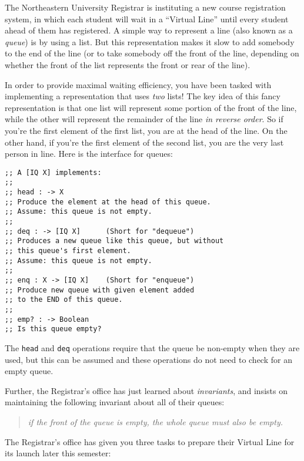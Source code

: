 \documentclass[12pt]{article}                   %
\def\pts#1{\marginpar{\footnotesize \raggedright  \fbox{#1 {\sc Points}}}}
\newcommand\code[1]{\texttt{#1}}
\begin{document}
\begin{problem} \pts{21}

The Northeastern University Registrar is instituting a new course
registration system, in which each student will wait in a ``Virtual
Line'' until every student ahead of them has registered.  A simple way
to represent a line (also known as a \emph{queue}) is by using a list.
But this representation makes it slow to add somebody to the end of
the line (or to take somebody off the front of the line, depending on
whether the front of the list represents the front or rear of the
line).  

In order to provide maximal waiting efficiency, you have been tasked
with implementing a representation that uses \emph{two} lists!  The
key idea of this fancy representation is that one list will represent
some portion of the front of the line, while the other will represent
the remainder of the line \emph{in reverse order}.  So if you're the
first element of the first list, you are at the head of the line.  On
the other hand, if you're the first element of the second list, you
are the very last person in line.
%
Here is the interface for queues:
\begin{verbatim}
;; A [IQ X] implements:
;;
;; head : -> X
;; Produce the element at the head of this queue.
;; Assume: this queue is not empty.
;;
;; deq : -> [IQ X]      (Short for "dequeue")
;; Produces a new queue like this queue, but without 
;; this queue's first element.
;; Assume: this queue is not empty.
;;
;; enq : X -> [IQ X]    (Short for "enqueue")
;; Produce new queue with given element added 
;; to the END of this queue.
;;
;; emp? : -> Boolean
;; Is this queue empty?
\end{verbatim}

The \code{head} and \code{deq} operations require that the queue be
non-empty when they are used, but this can be assumed and these
operations do not need to check for an empty queue.

Further, the Registrar's office has just learned about
\emph{invariants}, and insists on maintaining the following invariant
about all of their queues:

\begin{quote}
  {\it if the front of the queue is empty, the whole queue must also be empty.}
\end{quote} 

\noindent
The Registrar's office has given you three tasks to prepare their
Virtual Line for its launch later this semester:


\end{problem}
\end{document}
